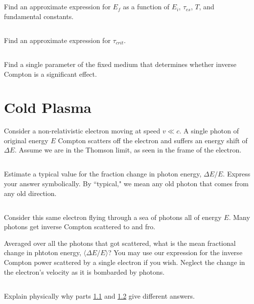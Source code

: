 \documentclass[11pt]{article}
\begin{document}
\subsection{}
Find an approximate expression for $E_f$ as a function of $E_i$, $\tau_{es}$, $T$, and
fundamental constants.

\subsection{}
Find an approximate expression for $\tau_{crit}$.

\subsection{}
Find a single parameter of the fixed medium that determines whether inverse Compton is a significant
effect.

\section{Cold Plasma}

Consider a non-relativistic electron moving at speed $v\ll c$.  A single photon
of original energy $E$ Compton scatters off the electron and suffers an energy shift
of $\Delta E$.  Assume we are in the Thomson limit, as seen in the frame of the electron.

\subsection{}\label{sec:parta}
Estimate a typical value for the fraction change in photon energy, $\Delta E/E$.  Express your
answer symbolically.  By ``typical," we mean any old photon that comes from any old direction.

\subsection{}\label{sec:partb}
Consider this same electron flying through a sea of photons all of energy $E$.  Many photons
get inverse Compton scattered to and fro.

Averaged over all the photons that got scattered, what is the mean fractional change
in phtoton energy, $\langle \Delta E/E\rangle$?  You may use our expression for the
inverse Compton power scattered by a single electron if you wish.  Neglect the change in the electron's velocity
as it is bombarded by photons.

\subsection{}
Explain physically why parts \ref{sec:parta} and \ref{sec:partb} give different answers.
\end{document}
